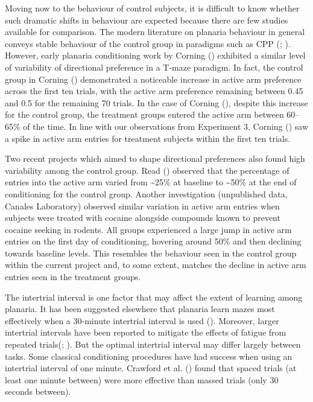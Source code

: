 \documentclass[
  jou,
  floatsintext,
  longtable,
  nolmodern,
  notxfonts,
  notimes,
  donotrepeattitle,
  colorlinks=true,linkcolor=blue,citecolor=blue,urlcolor=blue]{apa7}
\begin{document}
Moving now to the behaviour of control subjects, it is difficult to know
whether such dramatic shifts in behaviour are expected because there are
few studies available for comparison. The modern literature on planaria
behaviour in general conveys stable behaviour of the control group in
paradigms such as CPP
(;
). However,
early planaria conditioning work by Corning
() exhibited a similar level
of variability of directional preference in a T-maze paradigm. In fact,
the control group in Corning
() demonstrated a noticeable
increase in active arm preference across the first ten trials, with the
active arm preference remaining between 0.45 and 0.5 for the remaining
70 trials. In the case of Corning
(), despite this increase for
the control group, the treatment groups entered the active arm between
60--65\% of the time. In line with our observations from Experiment 3,
Corning () saw a spike in
active arm entries for treatment subjects within the first ten trials.

Two recent projects which aimed to shape directional preferences also
found high variability among the control group. Read
() observed that the
percentage of entries into the active arm varied from
\textasciitilde25\% at baseline to \textasciitilde50\% at the end of
conditioning for the control group. Another investigation (unpublished
data, Canales Laboratory) observed similar variation in active arm
entries when subjects were treated with cocaine alongside compounds
known to prevent cocaine seeking in rodents. All groups experienced a
large jump in active arm entries on the first day of conditioning,
hovering around 50\% and then declining towards baseline levels. This
resembles the behaviour seen in the control group within the current
project and, to some extent, matches the decline in active arm entries
seen in the treatment groups.

The intertrial interval is one factor that may affect the extent of
learning among planaria. It has been suggested elsewhere that planaria
learn mazes most effectively when a 30-minute intertrial interval is
used ().
Moreover, larger intertrial intervals have been reported to mitigate the
effects of fatigue from repeated
trials(;
). But the optimal
intertrial interval may differ largely between tasks. Some classical
conditioning procedures have had success when using an intertrial
interval of one minute. Crawford et al.
() found that spaced
trials (at least one minute between) were more effective than massed
trials (only 30 seconds between).
\end{document}
